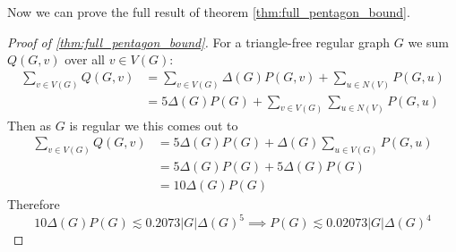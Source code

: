 Now we can prove the full result of theorem \ref{thm:full_pentagon_bound}.
\begin{proof}[Proof of \ref{thm:full_pentagon_bound}]
    For a triangle-free regular graph $G$ we sum $Q(G, v)$ over all $v \in V(G)$:
    \[
        \begin{split}
        \sum_{v \in V(G)} Q(G,v)
            &= \sum_{v \in V(G)} \Delta(G)P(G, v) + \sum_{u \in N(V)}P(G, u)\\
            &= 5\Delta(G)P(G) + \sum_{v\in V(G)}\sum_{u \in N(V)}P(G, u)
        \end{split}
    \]
    Then as $G$ is regular we this comes out to
    \[
        \begin{split}
            \sum_{v \in V(G)} Q(G,v)
            &= 5\Delta(G)P(G) + \Delta(G)\sum_{u\in V(G)}P(G, u)\\
            &= 5\Delta(G)P(G) + 5\Delta(G)P(G)\\
            &= 10\Delta(G)P(G)
        \end{split}
    \]
    Therefore
    \[
        10\Delta(G)P(G) \lesssim 0.2073|G|\Delta(G)^5
        \implies P(G) \lesssim 0.02073|G|\Delta(G)^4
    \]
\end{proof}

